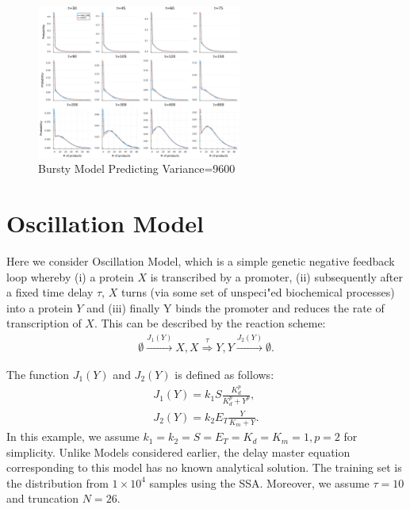 \documentclass[a4paper,10pt]{article}
\begin{document}
\begin{figure}[h]
	\centering
	\includegraphics[width=0.6\textwidth]{Figs/predict_var=9600.pdf}
	\caption{Bursty Model Predicting Variance=9600}\label{Bursty_predicting_var=9600}  
\end{figure}










\section{Oscillation Model}
Here we consider Oscillation Model, which is a simple genetic negative feedback loop whereby (i) a protein $X$ is transcribed by a promoter, (ii) subsequently after a fixed time delay $\tau$, $X$ turns (via some set of unspeci"ed biochemical processes) into a protein $Y$ and (iii) finally Y binds the promoter and reduces the rate of transcription of $X$. This can be described by the reaction scheme:
\begin{equation}\label{oscillation}
	\begin{aligned}
		\emptyset \xrightarrow{J_1(Y)} X,
		X\stackrel{\tau}\Rightarrow Y,
		Y\xrightarrow{J_2(Y)} \emptyset.
	\end{aligned}
\end{equation}

The function $J_1(Y)$ and $J_2(Y)$ is defined as follows:
\begin{equation}\label{oscillation}
	\begin{aligned}
	J_1(Y)=k_1S\frac{K^p_d}{K^p_d+Y^p},\\
	J_2(Y)=k_2E_T\frac{Y}{K_m+Y}.
	\end{aligned}
\end{equation}
In this example, we assume $k_1=k_2=S=E_T=K_d=K_m=1, p=2$ for simplicity. Unlike Models considered earlier, the delay master equation corresponding to this model has no known analytical solution. The training set is the distribution from $1 \times 10^4$ samples using the SSA. Moreover, we assume $\tau=10$ and truncation $N=26$.
\end{document}
